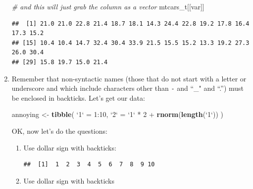 \documentclass[]{book}
\newenvironment{Shaded}{\begin{snugshade}}{\end{snugshade}}
\newcommand{\KeywordTok}[1]{\textcolor[rgb]{0.13,0.29,0.53}{\textbf{{#1}}}}
\newcommand{\DataTypeTok}[1]{\textcolor[rgb]{0.13,0.29,0.53}{{#1}}}
\newcommand{\DecValTok}[1]{\textcolor[rgb]{0.00,0.00,0.81}{{#1}}}
\newcommand{\StringTok}[1]{\textcolor[rgb]{0.31,0.60,0.02}{{#1}}}
\newcommand{\CommentTok}[1]{\textcolor[rgb]{0.56,0.35,0.01}{\textit{{#1}}}}
\newcommand{\NormalTok}[1]{{#1}}
\theoremstyle{definition}
\theoremstyle{definition}
\theoremstyle{remark}
\begin{document}
\begin{enumerate}
\begin{Shaded}
\begin{Highlighting}[]
\CommentTok{# and this will just grab the column as a vector}
\NormalTok{mtcars_t[[var]]}
\end{Highlighting}
\end{Shaded}

\begin{verbatim}
##  [1] 21.0 21.0 22.8 21.4 18.7 18.1 14.3 24.4 22.8 19.2 17.8 16.4 17.3 15.2
## [15] 10.4 10.4 14.7 32.4 30.4 33.9 21.5 15.5 15.2 13.3 19.2 27.3 26.0 30.4
## [29] 15.8 19.7 15.0 21.4
\end{verbatim}
\item
  Remember that non-syntactic names (those that do not start with a
  letter or underscore and which include characters other than
  \texttt{-} and ``\_" and ``.'') must be enclosed in backticks. Let's
  get our data:

\begin{Shaded}
\begin{Highlighting}[]
\NormalTok{annoying <-}\StringTok{ }\KeywordTok{tibble}\NormalTok{(}
\StringTok{`}\DataTypeTok{1}\StringTok{`} \NormalTok{=}\StringTok{ }\DecValTok{1}\NormalTok{:}\DecValTok{10}\NormalTok{,}
\StringTok{`}\DataTypeTok{2}\StringTok{`} \NormalTok{=}\StringTok{ `}\DataTypeTok{1}\StringTok{`} \NormalTok{*}\StringTok{ }\DecValTok{2} \NormalTok{+}\StringTok{ }\KeywordTok{rnorm}\NormalTok{(}\KeywordTok{length}\NormalTok{(}\StringTok{`}\DataTypeTok{1}\StringTok{`}\NormalTok{))}
\NormalTok{)}
\end{Highlighting}
\end{Shaded}

  OK, now let's do the questions:

  \begin{enumerate}
  \def\labelenumii{\arabic{enumii}.}
  \item
    Use dollar sign with backticks:

\begin{Shaded}
\end{Shaded}

\begin{verbatim}
##  [1]  1  2  3  4  5  6  7  8  9 10
\end{verbatim}
  \item
    Use dollar sign with backticks


\end{enumerate}
\end{enumerate}
\end{document}
